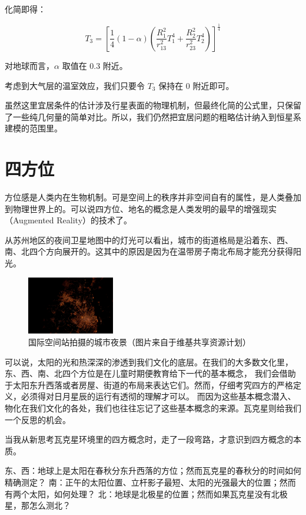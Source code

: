 \documentclass[a4paper,10.5pt]{book}
\begin{document}
化简即得：

$$T_3 = \left[ \frac{1}{4} \left( 1 - \alpha \right ) \left( \frac{R_1^2}{r_{13}^2} T_1^4 + \frac{R_2^2}{r_{23}^2} T_2^4 \right ) \right ]^{\frac{1}{4}}$$

对地球而言，$\alpha$ 取值在 0.3 附近。

考虑到大气层的温室效应，我们只要令 $T_3$ 保持在 0 附近即可。

虽然这里宜居条件的估计涉及行星表面的物理机制，但最终化简的公式里，只保留了一些纯几何量的简单对比。所以，我们仍然把宜居问题的粗略估计纳入到恒星系建模的范围里。

\section{四方位}

方位感是人类内在生物机制。可是空间上的秩序并非空间自有的属性，是人类叠加到物理世界上的。可以说四方位、地名的概念是人类发明的最早的增强现实（Augmented Reality）的技术了。

从苏州地区的夜间卫星地图中的灯光可以看出，城市的街道格局是沿着东、西、南、北四个方向展开的。这其中的原因是因为在温带房子南北布局才能充分获得阳光。

\begin{figure}[ht]
\centering
\includegraphics[width=1.5in]{images/4_01-ISS-30_Nighttime_view_of_Shanghai.jpg}
\caption{国际空间站拍摄的城市夜景（图片来自于维基共享资源计划）}
\end{figure}

可以说，太阳的光和热深深的渗透到我们文化的底层。在我们的大多数文化里，东、西、南、北四个方位是在儿童时期便教育给下一代的基本概念，
我们会借助于太阳东升西落或者房屋、街道的布局来表达它们。然而，仔细考究四方的严格定义，必须得对日月星辰的运行有透彻的理解才可以。
而因为这些基本概念潜入、物化在我们文化的各处，我们也往往忘记了这些基本概念的来源。瓦克星则给我们一个反思的机会。

当我从新思考瓦克星环境里的四方概念时，走了一段弯路，才意识到四方概念的本质。

东、西：地球上是太阳在春秋分东升西落的方位；然而瓦克星的春秋分的时间如何精确测定？
南：正午的太阳位置、立杆影子最短、太阳的光强最大的位置；然而有两个太阳，如何处理？
北：地球是北极星的位置；然而如果瓦克星没有北极星，那怎么测北？
\end{document}
